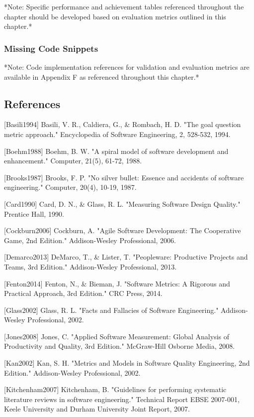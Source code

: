 \documentclass[11pt,a4paper]{article}
\begin{document}
*Note: Specific performance and achievement tables referenced throughout the chapter should be developed based on
evaluation metrics outlined in this chapter.*

\subsubsection{Missing Code Snippets}

*Note: Code implementation references for validation and evaluation metrics are available in Appendix F as referenced
throughout this chapter.*

\subsection{References}

[Basili1994] Basili, V. R., Caldiera, G., \& Rombach, H. D. "The goal question metric approach." Encyclopedia of Software
Engineering, 2, 528-532, 1994.

[Boehm1988] Boehm, B. W. "A spiral model of software development and enhancement." Computer, 21(5), 61-72, 1988.

[Brooks1987] Brooks, F. P. "No silver bullet: Essence and accidents of software engineering." Computer, 20(4), 10-19,
1987.

[Card1990] Card, D. N., \& Glass, R. L. "Measuring Software Design Quality." Prentice Hall, 1990.

[Cockburn2006] Cockburn, A. "Agile Software Development: The Cooperative Game, 2nd Edition." Addison-Wesley
Professional, 2006.

[Demarco2013] DeMarco, T., \& Lister, T. "Peopleware: Productive Projects and Teams, 3rd Edition." Addison-Wesley
Professional, 2013.

[Fenton2014] Fenton, N., \& Bieman, J. "Software Metrics: A Rigorous and Practical Approach, 3rd Edition." CRC Press,
2014.

[Glass2002] Glass, R. L. "Facts and Fallacies of Software Engineering." Addison-Wesley Professional, 2002.

[Jones2008] Jones, C. "Applied Software Measurement: Global Analysis of Productivity and Quality, 3rd Edition."
McGraw-Hill Osborne Media, 2008.

[Kan2002] Kan, S. H. "Metrics and Models in Software Quality Engineering, 2nd Edition." Addison-Wesley Professional,
2002.

[Kitchenham2007] Kitchenham, B. "Guidelines for performing systematic literature reviews in software engineering."
Technical Report EBSE 2007-001, Keele University and Durham University Joint Report, 2007.
\end{document}
